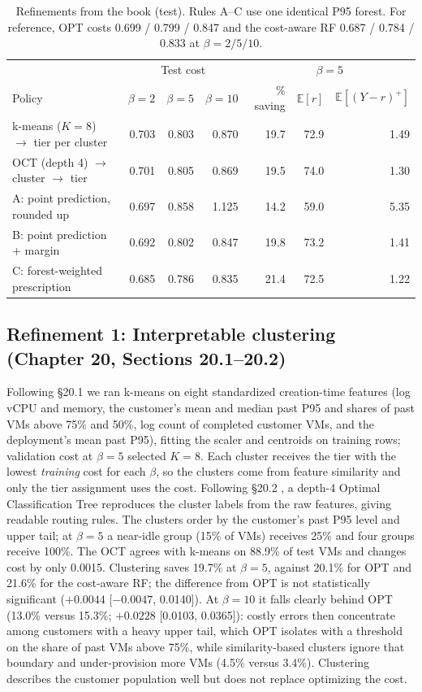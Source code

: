 \documentclass[10pt]{article}
\newcommand{\Ex}{\mathbb{E}}
\begin{document}
\begin{table}[!h]
\centering\small
\caption{Refinements from the book (test). Rules A--C use one identical P95 forest. For reference, OPT costs 0.699 / 0.799 / 0.847 and the cost-aware RF 0.687 / 0.784 / 0.833 at $\beta=2/5/10$.}
\label{tab:refine}
\setlength{\tabcolsep}{5pt}
\begin{tabular}{lrrr|rrr}
\toprule
 & \multicolumn{3}{c|}{Test cost} & \multicolumn{3}{c}{$\beta=5$} \\
Policy & $\beta{=}2$ & $\beta{=}5$ & $\beta{=}10$ & \% saving & $\Ex[r]$ & $\Ex[(Y{-}r)^+]$ \\
\midrule
k-means ($K=8$) $\to$ tier per cluster & 0.703 & 0.803 & 0.870 & 19.7 & 72.9 & 1.49 \\
OCT (depth 4) $\to$ cluster $\to$ tier & 0.701 & 0.805 & 0.869 & 19.5 & 74.0 & 1.30 \\
\midrule
A: point prediction, rounded up & 0.697 & 0.858 & 1.125 & 14.2 & 59.0 & 5.35 \\
B: point prediction + margin & 0.692 & 0.802 & 0.847 & 19.8 & 73.2 & 1.41 \\
C: forest-weighted prescription & 0.685 & 0.786 & 0.835 & 21.4 & 72.5 & 1.22 \\
\bottomrule
\end{tabular}
\end{table}

\subsection{Refinement 1: Interpretable clustering (Chapter 20, Sections 20.1--20.2)}

Following \S20.1 we ran k-means \citep{lloyd1982kmeans} on eight standardized creation-time features (log vCPU and memory, the customer's mean and median past P95 and shares of past VMs above 75\% and 50\%, log count of completed customer VMs, and the deployment's mean past P95), fitting the scaler and centroids on training rows; validation cost at $\beta=5$ selected $K=8$. Each cluster receives the tier with the lowest \emph{training} cost for each $\beta$, so the clusters come from feature similarity and only the tier assignment uses the cost. Following \S20.2 \citep{bertsimas2017oct,bertsimas2021clustering}, a depth-4 Optimal Classification Tree reproduces the cluster labels from the raw features, giving readable routing rules. The clusters order by the customer's past P95 level and upper tail; at $\beta=5$ a near-idle group (15\% of VMs) receives 25\% and four groups receive 100\%. The OCT agrees with k-means on 88.9\% of test VMs and changes cost by only 0.0015. Clustering saves 19.7\% at $\beta=5$, against 20.1\% for OPT and 21.6\% for the cost-aware RF; the difference from OPT is not statistically significant ($+0.0044$ [$-0.0047$, 0.0140]). At $\beta=10$ it falls clearly behind OPT (13.0\% versus 15.3\%; $+0.0228$ [0.0103, 0.0365]): costly errors then concentrate among customers with a heavy upper tail, which OPT isolates with a threshold on the share of past VMs above 75\%, while similarity-based clusters ignore that boundary and under-provision more VMs (4.5\% versus 3.4\%). Clustering describes the customer population well but does not replace optimizing the cost.
\end{document}
